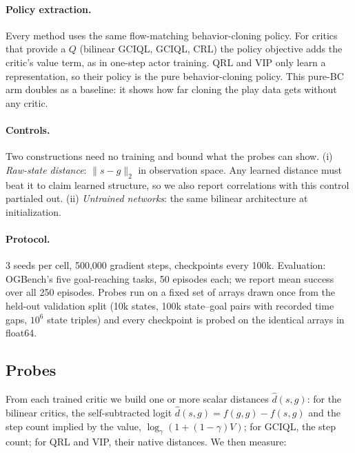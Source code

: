 \paragraph{Policy extraction.}
Every method uses the same flow-matching behavior-cloning policy. For critics that provide
a $Q$ (bilinear GCIQL, GCIQL, CRL) the policy objective adds the critic's value term, as in
one-step actor training. QRL and VIP only learn a representation, so their policy is the
pure behavior-cloning policy. This pure-BC arm doubles as a baseline: it shows how far
cloning the play data gets without any critic.

\paragraph{Controls.}
Two constructions need no training and bound what the probes can show. (i)
\emph{Raw-state distance}: $\|s-g\|_2$ in observation space. Any learned distance must beat
it to claim learned structure, so we also report correlations with this control partialed
out. (ii) \emph{Untrained networks}: the same bilinear architecture at initialization.

\paragraph{Protocol.}
3 seeds per cell, 500{,}000 gradient steps, checkpoints every 100k. Evaluation: OGBench's
five goal-reaching tasks, 50 episodes each; we report mean success over all 250 episodes.
Probes run on a fixed set of arrays drawn once from the held-out validation split (10k
states, 100k state--goal pairs with recorded time gaps, $10^6$ state triples) and every
checkpoint is probed on the identical arrays in float64.

\subsection{Probes}

From each trained critic we build one or more scalar distances $\hat d(s,g)$: for the
bilinear critics, the self-subtracted logit $\hat d(s,g)=f(g,g)-f(s,g)$ and the step count
implied by the value, $\log_\gamma(1+(1-\gamma)V)$; for GCIQL, the step count; for QRL and
VIP, their native distances. We then measure:

